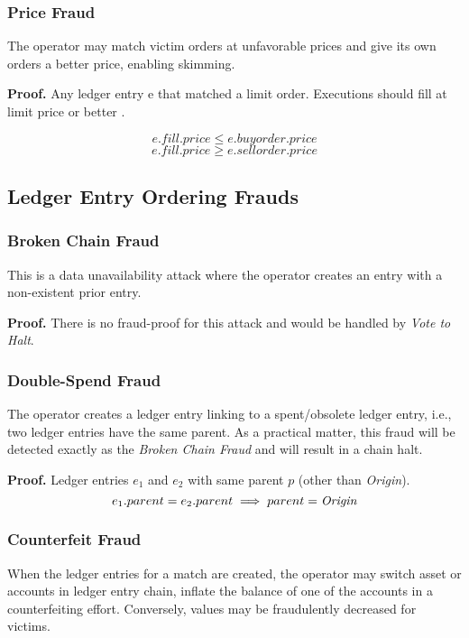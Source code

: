 \documentclass[12pt,a4paper]{article}
\begin{document}
\subsubsection{Price Fraud} \label{fp:prc}
The operator may match victim orders at unfavorable prices and give its own orders a better price, enabling skimming.

\textbf{Proof.} Any ledger entry e that matched a limit order. Executions should fill at limit price or better . 

\begin{equation}
    e.fill.price \leq e.buyorder.price
\end{equation}
\begin{equation}
    e.fill.price \geq e.sellorder.price
\end{equation}


\subsection{Ledger Entry Ordering Frauds}
\subsubsection{Broken Chain Fraud}\label{fp:bc}
This is a data unavailability attack where the operator creates an entry with a non-existent prior entry.

\textbf{Proof.} There is no fraud-proof for this attack and would be handled by \emph{Vote to Halt}.
\subsubsection{Double-Spend Fraud}\label{fp:dsf}
The operator creates a ledger entry linking to a spent/obsolete ledger entry, i.e., two ledger entries have the same parent. As a practical matter, this fraud will be detected exactly as the \emph{Broken Chain Fraud} and will result in a chain halt.

\textbf{Proof.} Ledger entries $e_1$ and $e_2$ with same parent $p$ (other than \emph{Origin}).
\begin{equation}
    e_1.parent = e_2.parent \implies parent = \emph{Origin}
\end{equation}
\subsubsection{Counterfeit Fraud} \label{fp:cff}
When the ledger entries for a match are created, the operator may switch asset or accounts in ledger entry chain, inflate the balance of one of the accounts in a counterfeiting effort. Conversely, values may be fraudulently decreased for victims.
\end{document}

